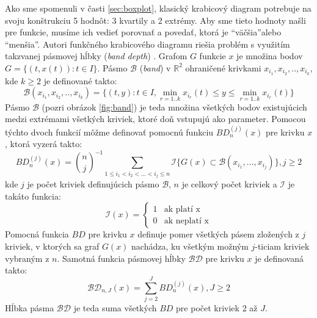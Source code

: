 Ako sme spomenuli v časti \ref{sec:boxplot}, klasický krabicový diagram potrebuje na svoju konštrukciu 5 hodnôt: 3 kvartily a 2 extrémy. Aby sme tieto hodnoty našli pre funkcie, musíme ich vedieť porovnať a povedať, ktorá je \textquotedblleft väčšia\textquotedblright alebo \textquotedblleft menšia\textquotedblright. Autori funkčného krabicového diagramu riešia problém s využitím takzvanej pásmovej hĺbky (\textit{band depth}) \cite{BandDepth}. Grafom $ G $ funkcie $ x $ je množina bodov $ G = \{ (t,x(t)) : t \in I \} $. Pásmo $ \mathcal{B} $ (\textit{band}) v $ \mathbb{R}^{2}  $ ohraničené krivkami $ x_{i_{1}}, x_{i_{2}}, .. , x_{i_{k}} $, kde $ k \geq 2 $ je definované takto:
\[
	\mathcal{B}(x_{i_{1}}, x_{i_{2}}, .. , x_{i_{k}}) = \{ (t,y) : t \in I, \min_{r=1..k}x_{i_{r}}(t) \leq y \leq \min_{r=1..k}x_{i_{r}}(t) \}
\]
Pásmo $ \mathcal{B} $ (pozri obrázok \ref{fig:band}) je teda množina všetkých bodov existujúcich medzi extrémami všetkých kriviek, ktoré doň vstupujú ako parameter. 
Pomocou týchto dvoch funkcií môžme definovať pomocnú funkciu $ BD_{n}^{(j)}(x) $ pre krivku $ x $, ktorá vyzerá takto:
\[
	BD^{(j)}_{n}(x) = {n \choose j}^{-1} \sum_{1 \leq i_{1} < i_{2} < ... < i_{j} \leq n} \mathcal{I}\{ G(x) \subset \mathcal{B}(x_{i_{1}}, ... ,x_{i_{j}}) \}, j \geq 2
\]
kde $ j $ je počet kriviek definujúcich pásmo $ \mathcal{B} $, $ n $ je celkový počet kriviek a $ \mathcal{I} $ je takáto funkcia:
\[
	\mathcal{I}(x) = \left\{
	\begin{array}{ll}
	1 & \mbox{ak platí x}  \\
	0 & \mbox{ak neplatí x} 
	\end{array}
	\right.
\]
Pomocná funkcia $ BD $ pre krivku $ x $ definuje pomer všetkých pásem zložených z $ j $ kriviek, v ktorých sa graf $ G(x) $ nachádza, ku všetkým možným $ j $-ticiam kriviek vybraným z $ n $. 
Samotná funkcia pásmovej hĺbky $ \mathcal{BD} $ pre krivku $ x $ je definovaná takto:
\[
	\mathcal{BD}_{n, J}(x) = \sum_{j = 2}^{J} BD^{(j)}_{n}(x), J \geq 2
\]
Hĺbka pásma $ \mathcal{BD} $ je teda suma všetkých $ BD $ pre počet kriviek 2 až $ J $.

